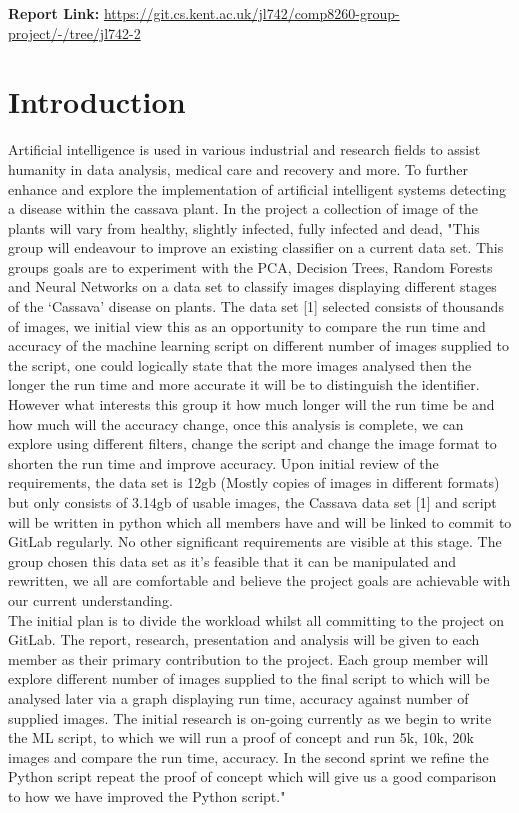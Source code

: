 
\textbf{Report Link:} \href{https://git.cs.kent.ac.uk/jl742/comp8260-group-project/-/tree/jl742-2}{https://git.cs.kent.ac.uk/jl742/comp8260-group-project/-/tree/jl742-2}

\section{Introduction}
\label{Introduction Section}

Artificial intelligence is used in various industrial and research fields to assist humanity in data analysis, medical care and recovery and more. To further enhance and explore the implementation of artificial intelligent systems detecting a disease within the cassava plant. In the project a collection of image of the plants will vary from healthy, slightly infected, fully infected and dead, "This group will endeavour to improve an existing classifier on a current data set. This groups goals are to experiment with the PCA, Decision Trees, Random Forests and Neural Networks on a data set to classify images displaying different stages of the ‘Cassava’ disease on plants. The data set [1] selected consists of thousands of images, we initial view this as an opportunity to compare the run time and accuracy of the machine learning script on different number of images supplied to the script, one could logically state that the more images analysed then the longer the run time and more accurate it will be to distinguish the identifier. \\

However what interests this group it how much longer will the run time be and how much will the accuracy change, once this analysis is complete, we can explore using different filters, change the script and change the image format to shorten the run time and improve accuracy. Upon initial review of the requirements, the data set is 12gb (Mostly copies of images in different formats) but only consists of 3.14gb of usable images, the Cassava data set [1] and script will be written in python which all members have and will be linked to commit to GitLab regularly. No other significant requirements are visible at this stage. The group chosen this data set as it's feasible that it can be manipulated and rewritten, we all are comfortable and believe the project goals are achievable with our current understanding. \\

The initial plan is to divide the workload whilst all committing to the project on GitLab. The report, research, presentation and analysis will be given to each member as their primary contribution to the project. Each group member will explore different number of images supplied to the final script to which will be analysed later via a graph displaying run time, accuracy against number of supplied images. The initial research is on-going currently as we begin to write the ML script, to which we will run a proof of concept and run 5k, 10k, 20k images and compare the run time, accuracy. In the second sprint we refine the Python script repeat the proof of concept which will give us a good comparison to how we have improved the Python script." \cite{Plan}
